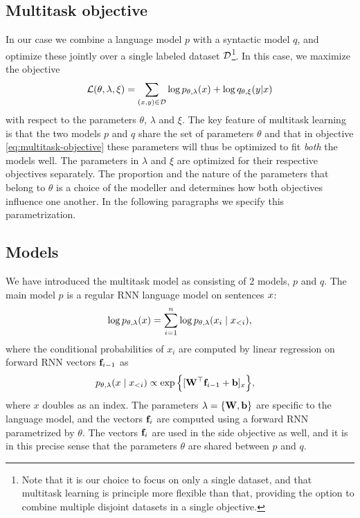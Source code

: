 \subsection{Multitask objective}
  In our case we combine a language model $p$ with a syntactic model $q$, and optimize these jointly over a single labeled dataset $\mathcal{D}$\footnote{Note that it is our choice to focus on only a single dataset, and that multitask learning is principle more flexible than that, providing the option to combine multiple disjoint datasets in a single objective.}. In this case, we maximize the objective
  \begin{equation}
    \label{eq:multitask-objective}
    \mathcal{L}(\theta, \lambda, \xi) = \sum_{ (x, y) \in \mathcal{D} }\log p_{\theta, \lambda}(x) + \log q_{\theta,\xi}(y | x)
  \end{equation}
  with respect to the parameters $\theta$, $\lambda$ and $\xi$. The key feature of multitask learning is that the two models $p$ and $q$ share the set of parameters $\theta$ and that in objective \ref{eq:multitask-objective} these parameters will thus be optimized to fit \textit{both} the models well. The parameters in $\lambda$ and $\xi$ are optimized for their respective objectives separately. The proportion and the nature of the parameters that belong to $\theta$ is a choice of the modeller and determines how both objectives influence one another. In the following paragraphs we specify this parametrization.

\subsection{Models}
  We have introduced the multitask model as consisting of 2 models, $p$ and $q$. The main model $p$ is a regular RNN language model on sentences $x$:
  \begin{align*}
    \log p_{\theta, \lambda}(x) = \sum_{i=1}^n \log p_{\theta, \lambda}(x_i \mid x_{<i}),
  \end{align*}
  where the conditional probabilities of $x_i$ are computed by linear regression on forward RNN vectors $\mathbf{f}_{i-1}$ as
  \begin{align*}
    p_{\theta, \lambda}( x \mid x_{<i}) &\propto \exp \Big \{ [ \mathbf{W}^{\top} \mathbf{f}_{i-1} + \mathbf{b} ]_{x} \Big\},
  \end{align*}
  where $x$ doubles as an index. The parameters $\lambda = \{ \mathbf{W}, \mathbf{b} \}$ are specific to the language model, and the vectors $\mathbf{f}_i$ are computed using a forward RNN parametrized by $\theta$. The vectors $\mathbf{f}_i$ are used in the side objective as well, and it is in this precise sense that the parameters $\theta$ are shared between $p$ and $q$.

